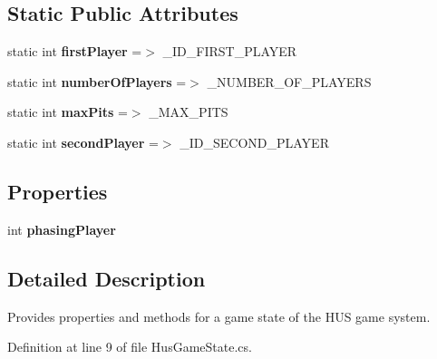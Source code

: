 \subsection*{Static Public Attributes}
\begin{DoxyCompactItemize}
\item 
\mbox{\label{class_hus_1_1_hus_game_state_ac1917bc0f998d0020b14cdf9a8aee5e1}} 
static int {\bfseries first\+Player} =$>$ \+\_\+\+I\+D\+\_\+\+F\+I\+R\+S\+T\+\_\+\+P\+L\+A\+Y\+ER
\item 
\mbox{\label{class_hus_1_1_hus_game_state_a078351292567538d3c41129fe1aa9833}} 
static int {\bfseries number\+Of\+Players} =$>$ \+\_\+\+N\+U\+M\+B\+E\+R\+\_\+\+O\+F\+\_\+\+P\+L\+A\+Y\+E\+RS
\item 
\mbox{\label{class_hus_1_1_hus_game_state_a81429154fe8cfbe438f7c60f97624291}} 
static int {\bfseries max\+Pits} =$>$ \+\_\+\+M\+A\+X\+\_\+\+P\+I\+TS
\item 
\mbox{\label{class_hus_1_1_hus_game_state_a22c57ee8459880d372162de95a81663a}} 
static int {\bfseries second\+Player} =$>$ \+\_\+\+I\+D\+\_\+\+S\+E\+C\+O\+N\+D\+\_\+\+P\+L\+A\+Y\+ER
\end{DoxyCompactItemize}
\subsection*{Properties}
\begin{DoxyCompactItemize}
\item 
\mbox{\label{class_hus_1_1_hus_game_state_ac7848176a55c4a95298dd464b83c9f7b}} 
int {\bfseries phasing\+Player}
\end{DoxyCompactItemize}


\subsection{Detailed Description}
Provides properties and methods for a game state of the H\+US game system. 



Definition at line 9 of file Hus\+Game\+State.\+cs.



